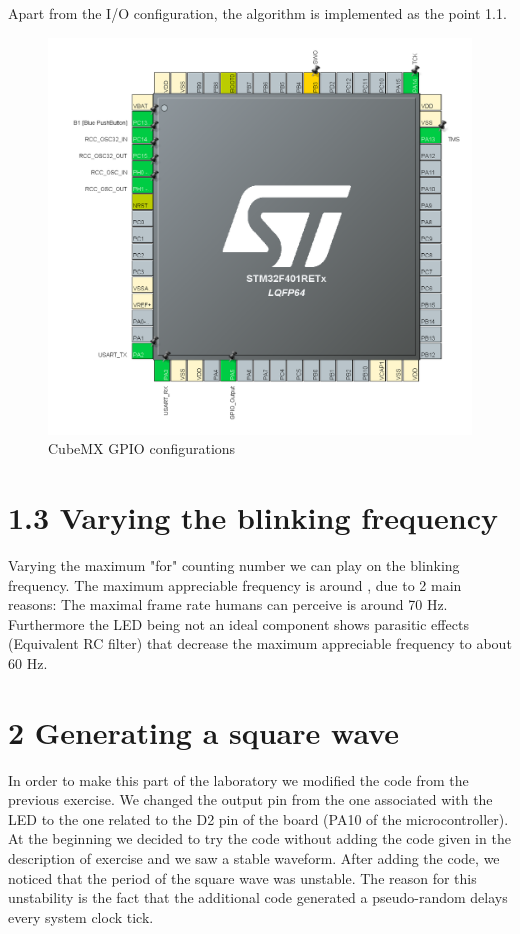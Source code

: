 \documentclass[12pt]{article}
\begin{document}
Apart from the I/O configuration, the algorithm is implemented as the point 1.1.

	\begin{figure}[!h]
		\centering
		\includegraphics[scale = 0.5]{immagini/1_2.png}
		\caption{CubeMX GPIO configurations}
	\end{figure}
\newpage
\section*{1.3 Varying the blinking frequency}

Varying the maximum "for" counting number we can play on the blinking frequency.
The maximum appreciable frequency is around , due to 2 main reasons:
The maximal frame rate humans can perceive is around 70 Hz. Furthermore the LED being not an ideal component shows parasitic effects (Equivalent RC filter) that decrease the maximum appreciable frequency to about 60 Hz. 

\section*{2 Generating a square wave}
In order to make this part of the laboratory we modified the code from the previous exercise. We changed the output pin from the one associated with the LED to the one related to the D2 pin of the board (PA10 of the microcontroller).
At the beginning we decided to try the code without adding the code given in the description of exercise and we saw a stable waveform. After adding the code, we noticed that the period of the square wave was unstable. The reason for this unstability is the fact that the additional code generated a pseudo-random delays every system clock tick.
\end{document}
